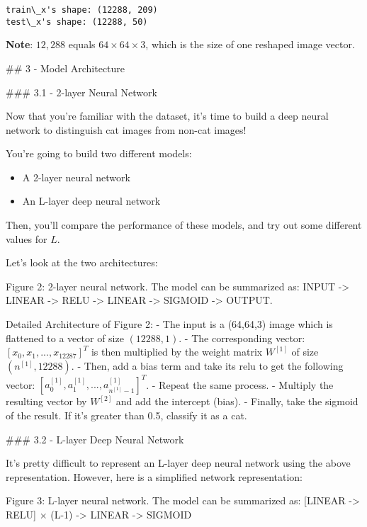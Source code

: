 \documentclass[11pt]{article}
\providecommand{\tightlist}{%
      \setlength{\itemsep}{0pt}\setlength{\parskip}{0pt}}
\begin{document}
    \begin{Verbatim}[commandchars=\\\{\}]
train\_x's shape: (12288, 209)
test\_x's shape: (12288, 50)
    \end{Verbatim}

    \textbf{Note}: \(12,288\) equals \(64 \times 64 \times 3\), which is the
size of one reshaped image vector.

    \#\# 3 - Model Architecture

    \#\#\# 3.1 - 2-layer Neural Network

Now that you're familiar with the dataset, it's time to build a deep
neural network to distinguish cat images from non-cat images!

You're going to build two different models:

\begin{itemize}
\tightlist
\item
  A 2-layer neural network
\item
  An L-layer deep neural network
\end{itemize}

Then, you'll compare the performance of these models, and try out some
different values for \(L\).

Let's look at the two architectures:

Figure 2: 2-layer neural network. The model can be summarized as: INPUT
-\textgreater{} LINEAR -\textgreater{} RELU -\textgreater{} LINEAR
-\textgreater{} SIGMOID -\textgreater{} OUTPUT.

Detailed Architecture of Figure 2: - The input is a (64,64,3) image
which is flattened to a vector of size \((12288,1)\). - The
corresponding vector: \([x_0,x_1,...,x_{12287}]^T\) is then multiplied
by the weight matrix \(W^{[1]}\) of size \((n^{[1]}, 12288)\). - Then,
add a bias term and take its relu to get the following vector:
\([a_0^{[1]}, a_1^{[1]},..., a_{n^{[1]}-1}^{[1]}]^T\). - Repeat the same
process. - Multiply the resulting vector by \(W^{[2]}\) and add the
intercept (bias). - Finally, take the sigmoid of the result. If it's
greater than 0.5, classify it as a cat.

\#\#\# 3.2 - L-layer Deep Neural Network

It's pretty difficult to represent an L-layer deep neural network using
the above representation. However, here is a simplified network
representation:

Figure 3: L-layer neural network. The model can be summarized as:
{[}LINEAR -\textgreater{} RELU{]} \(\times\) (L-1) -\textgreater{}
LINEAR -\textgreater{} SIGMOID
\end{document}
